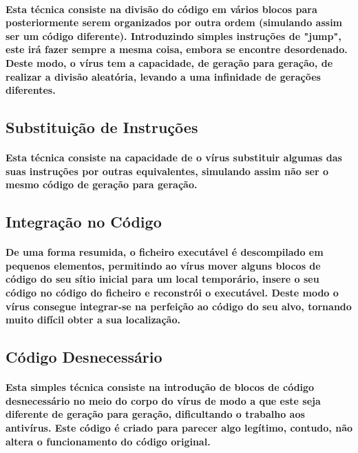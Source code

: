 \documentclass[runningheads]{llncs}
\begin{document}
\paragraph{Esta técnica consiste na divisão do código em vários blocos para posteriormente serem organizados por outra ordem (simulando assim ser um código diferente). Introduzindo simples instruções de "jump", este irá fazer sempre a mesma coisa, embora se encontre desordenado. Deste modo, o vírus tem a capacidade, de geração para geração, de realizar a divisão aleatória, levando a uma infinidade de gerações diferentes.}

\subsection{Substituição de Instruções}

\paragraph{Esta técnica consiste na capacidade de o vírus substituir algumas das suas instruções por outras equivalentes, simulando assim não ser o mesmo código de geração para geração.}

\subsection{Integração no Código}

\paragraph{De uma forma resumida, o ficheiro executável é descompilado em pequenos elementos, permitindo ao vírus mover alguns blocos de código do seu sítio inicial para um local temporário, insere o seu código no código do ficheiro e reconstrói o executável. Deste modo o vírus consegue integrar-se na perfeição ao código do seu alvo, tornando muito difícil obter a sua localização.}

\subsection{Código Desnecessário}

\paragraph{Esta simples técnica consiste na introdução de blocos de código desnecessário no meio do corpo do vírus de modo a que este seja diferente de geração para geração, dificultando o trabalho aos antivírus. Este código é criado para parecer algo legítimo, contudo, não altera o funcionamento do código original.}
\end{document}
